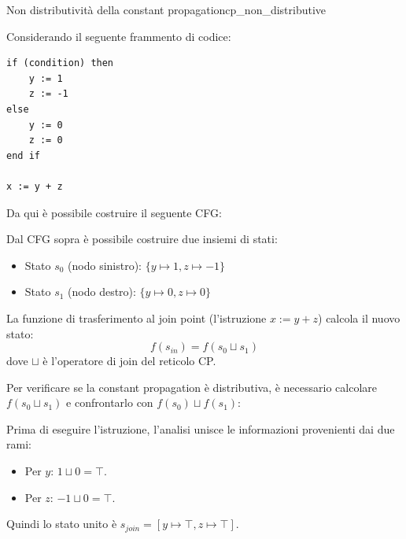 \begin{nota}{Non distributività della constant propagation}{cp_non_distributive}

    Considerando il seguente frammento di codice:

\begin{verbatim}
if (condition) then
    y := 1
    z := -1
else
    y := 0
    z := 0
end if

x := y + z
\end{verbatim}

Da qui è possibile costruire il seguente CFG:

\begin{center}
\end{center}

Dal CFG sopra è possibile costruire due insiemi di stati:
\begin{itemize}
    \item Stato $s_0$ (nodo sinistro): $ \{ y \mapsto 1, z \mapsto -1 \} $
    \item Stato $s_1$ (nodo destro): $ \{ y \mapsto 0, z \mapsto 0 \} $
\end{itemize}

La funzione di trasferimento al join point (l'istruzione $x := y + z$) calcola il
nuovo stato:
\[
f(s_{in}) = f(s_0 \sqcup s_1)
\]
dove $\sqcup$ è l'operatore di join del reticolo CP.

Per verificare se la constant propagation è distributiva, è necessario calcolare
$f(s_0 \sqcup s_1)$ e confrontarlo con $f(s_0) \sqcup f(s_1)$:
 

Prima di eseguire l'istruzione, l'analisi unisce le informazioni provenienti
dai due rami:
\begin{itemize}
    \item Per $y$: $1 \sqcup 0 = \top$.
    \item Per $z$: $-1 \sqcup 0 = \top$.
\end{itemize}
Quindi lo stato unito è $s_{join} = [ y \mapsto \top, z \mapsto \top ]$.



\end{nota}
